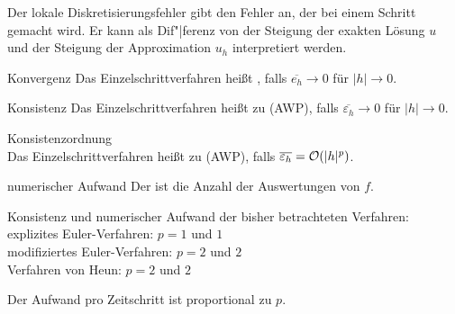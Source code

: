 \begin{Bem}
    Der lokale Diskretisierungsfehler gibt den Fehler an, der bei einem
    Schritt gemacht wird.
    Er kann als Dif"|ferenz von der Steigung der exakten Lösung $u$ und der
    Steigung der Approximation $u_h$ interpretiert werden.
\end{Bem}

\linie

\begin{Def}{Konvergenz}
    Das Einzelschrittverfahren heißt , falls
    $\overline{e_h} \to 0$ für $|h| \to 0$.
\end{Def}

\linie

\begin{Def}{Konsistenz}
    Das Einzelschrittverfahren heißt  zu (AWP), falls
    $\overline{\varepsilon_h} \to 0$ für $|h| \to 0$.
\end{Def}

\begin{Def}{Konsistenzordnung}\\
    Das Einzelschrittverfahren heißt  zu
    (AWP), falls
    $\overline{\varepsilon_h} = \mathcal{O}(|h|^p)$.
\end{Def}

\begin{Def}{numerischer Aufwand}
    Der  ist die Anzahl der Auswertungen von $f$.
\end{Def}

\begin{Bsp}
    Konsistenz und numerischer Aufwand der bisher betrachteten Verfahren:\\
    explizites Euler-Verfahren: $p = 1$ und $1$\\
    modifiziertes Euler-Verfahren: $p = 2$ und $2$\\
    Verfahren von Heun: $p = 2$ und $2$
\end{Bsp}

\begin{Bem}
    Der Aufwand pro Zeitschritt ist proportional zu $p$.
\end{Bem}

\linie

